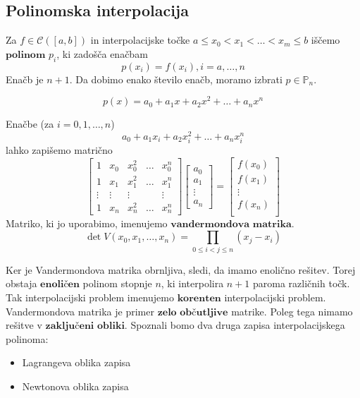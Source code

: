 \documentclass[a4paper,12pt]{article}
\theoremstyle{definition}
\theoremstyle{remark}
\newcommand{\Pp}{\mathbb{P}}
\begin{document}
\subsection{Polinomska interpolacija}
Za $f \in \mathscr{C}([a, b])$ in interpolacijske točke $a \leq x_0 < x_1 < \dots < x_m \leq b$ iščemo $\textbf{polinom}$ $p_i$, ki zadošča enačbam
\begin{equation*}
    p(x_i) = f(x_i), i = a, \dots, n
\end{equation*}
Enačb je $n+1$. Da dobimo enako število enačb, moramo izbrati $p \in \Pp_n$.

\begin{equation*}
    p(x) = a_0 + a_1 x + a_2 x^2 + \dots + a_n x^n
\end{equation*}

Enačbe (za $i = 0, 1, \dots, n$)
\begin{equation*}
    a_0 + a_1 x_i + a_2 x_i^2 + \dots + a_n x_i^n
\end{equation*}
lahko zapišemo matrično
\begin{equation*}
    \begin{bmatrix}
        1 & x_0 & x_0^2 & \dots & x_0^n \\
        1 & x_1 & x_1^2 & \dots & x_1^n \\
    \vdots & \vdots & \vdots &  & \vdots \\
        1 & x_n & x_n^2 & \dots & x_n^n 
    \end{bmatrix}
    \begin{bmatrix}
        a_0 \\
        a_1 \\
        \vdots \\
        a_n
    \end{bmatrix}
    =
    \begin{bmatrix}
        f(x_0) \\
        f(x_1) \\
        \vdots \\
        f(x_n) \\
    \end{bmatrix}
\end{equation*}
Matriko, ki jo uporabimo, imenujemo $\textbf{vandermondova matrika}$.
\begin{equation*}
    \det V(x_0, x_1, \dots, x_n) = \prod_{0 \leq i < j \leq n} (x_j - x_i)
\end{equation*}

Ker je Vandermondova matrika obrnljiva, sledi, da imamo enolično rešitev. Torej obstaja $\textbf{enoličen}$ polinom stopnje $n$, ki interpolira $n+1$ paroma
različnih točk.
Tak interpolacijski problem imenujemo $\textbf{korenten}$ interpolacijski problem.
Vandermondova matrika je primer $\textbf{zelo občutljive}$ matrike.
Poleg tega nimamo rešitve v $\textbf{zaključeni obliki}$.
Spoznali bomo dva druga zapisa interpolacijskega polinoma:
\begin{itemize}
    \item Lagrangeva oblika zapisa
    \item Newtonova oblika zapisa
\end{itemize}
\end{document}
